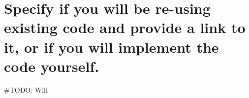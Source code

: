 \documentclass[11pt,a4paper]{article}
\begin{document}
\section{Specify if you will be re-using existing code and provide
a link to it, or if you will implement the code yourself.}
\#TODO: Will









\end{document}
